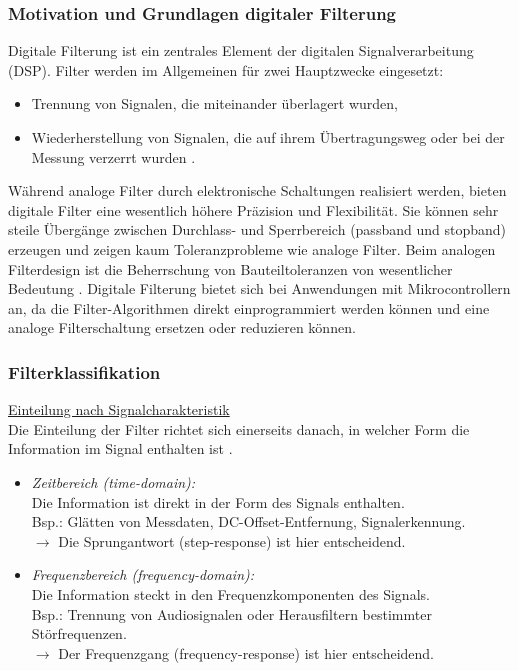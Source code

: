 \documentclass[a4paper, portrait, 12pt]{scrartcl} %
\begin{document}
\subsubsection{Motivation und Grundlagen digitaler Filterung}
Digitale Filterung ist ein zentrales Element der digitalen Signalverarbeitung (DSP). Filter werden im Allgemeinen für zwei Hauptzwecke eingesetzt:
\begin{itemize}
	\item Trennung von Signalen, die miteinander überlagert wurden,

	\item Wiederherstellung von Signalen, die auf ihrem Übertragungsweg oder bei der Messung verzerrt wurden \cite[S. 261]{Smith1999}.
\end{itemize}

Während analoge Filter durch elektronische Schaltungen realisiert werden, bieten digitale Filter eine wesentlich höhere Präzision und Flexibilität. Sie können sehr steile Übergänge zwischen Durchlass- und Sperrbereich (passband und stopband) erzeugen und zeigen kaum Toleranzprobleme wie analoge Filter. Beim analogen Filterdesign ist die Beherrschung von Bauteiltoleranzen von wesentlicher Bedeutung \cite[S. 262]{Smith1999}. Digitale Filterung bietet sich bei Anwendungen mit Mikrocontrollern an, da die Filter-Algorithmen direkt einprogrammiert werden können und eine analoge Filterschaltung ersetzen oder reduzieren können.

\subsubsection{Filterklassifikation}

\underline{Einteilung nach Signalcharakteristik}\\
Die Einteilung der Filter richtet sich einerseits danach, in welcher Form die Information im Signal enthalten ist \cite[S. 265]{Smith1999}.

\begin{itemize}
	\item \emph{Zeitbereich (time-domain):}\\
	Die Information ist direkt in der Form des Signals enthalten.\\
	Bsp.: Glätten von Messdaten, DC-Offset-Entfernung, Signalerkennung.\\
	$\rightarrow$ Die Sprungantwort (step-response) ist hier entscheidend.

	\item \emph{Frequenzbereich (frequency-domain):}\\
	Die Information steckt in den Frequenzkomponenten des Signals.\\
	Bsp.: Trennung von Audiosignalen oder Herausfiltern bestimmter Störfrequenzen.\\
	$\rightarrow$ Der Frequenzgang (frequency-response) ist hier entscheidend.
\end{itemize}
\end{document}
